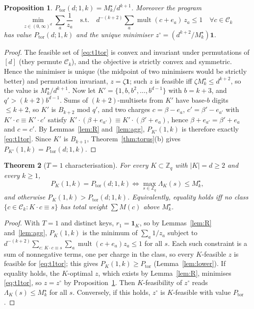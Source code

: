 \documentclass[11pt]{article}
\newcommand{\Z}{\mathbb{Z}}
\newcommand{\mult}{\operatorname{mult}}
\newcommand{\Ptor}{P_{\mathrm{tor}}}
\newtheorem{theorem}{Theorem}
\newtheorem{proposition}[theorem]{Proposition}
\theoremstyle{definition}
\theoremstyle{remark}
\begin{document}
\begin{proposition}\label{prop:t1tor}
$\Ptor(d;1,k)=M^\star_k/d^{k+1}$. Moreover the program
\begin{equation}\label{eq:t1tor}
\min_{z\in(0,\infty)^d}\sum_a\frac1{z_a}\quad\text{s.t.}\quad d^{-(k+2)}\sum_a\mult(c+e_a)\,z_a\le1\quad\forall c\in\mathcal C_k
\end{equation}
has value $\Ptor(d;1,k)$ and the unique minimiser $z^\circ=(d^{k+2}/M^\star_k)\mathbf 1$.
\end{proposition}
\begin{proof}
The feasible set of \eqref{eq:t1tor} is convex and invariant under permutations of $[d]$ (they permute $\mathcal C_k$), and the objective
is strictly convex and symmetric. Hence the minimiser is unique (the midpoint of two minimisers would be strictly better) and
permutation invariant, $z=\zeta\mathbf 1$; such $z$ is feasible iff $\zeta M^\star_k\le d^{k+2}$, so the value is $M^\star_k/d^{k+1}$.
Now let $K'=\{1,b,b^2,\dots,b^{d-1}\}$ with $b=k+3$, and $q'>(k+2)b^{d-1}$. Sums of $(k+2)$-multisets from $K'$ have base-$b$ digits $\le k+2$,
so $K'$ is $B_{k+2}$ mod $q'$, and two charges $c=\beta-e_a$, $c'=\beta'-e_{a'}$ with $K'\cdot c\equiv K'\cdot c'$ satisfy
$K'\cdot(\beta+e_{a'})\equiv K'\cdot(\beta'+e_a)$, hence $\beta+e_{a'}=\beta'+e_a$ and $c=c'$. By Lemmas~\ref{lem:R} and~\ref{lem:agg}, $P_{K'}(1,k)$
is therefore exactly \eqref{eq:t1tor}. Since $K'$ is $B_{k+1}$, Theorem~\ref{thm:torus}(b) gives $P_{K'}(1,k)=\Ptor(d;1,k)$.
\end{proof}

\begin{theorem}[$T=1$ characterisation]\label{thm:t1iff}
For every $K\subset\Z_q$ with $|K|=d\ge2$ and every $k\ge1$,
\[
P_K(1,k)=\Ptor(d;1,k)\iff\max_{s\in\Z_q}\Lambda_K(s)\le M^\star_k ,
\]
and otherwise $P_K(1,k)>\Ptor(d;1,k)$. Equivalently, equality holds iff no class $\{c\in\mathcal C_k:K\cdot c\equiv s\}$ has total
weight $\sum M(c)$ above $M^\star_k$.
\end{theorem}
\begin{proof}
With $T=1$ and distinct keys, $r_1=\mathbf 1_K$, so by Lemmas~\ref{lem:R} and~\ref{lem:agg}, $P_K(1,k)$ is the minimum of $\sum_a1/z_a$ subject
to $d^{-(k+2)}\sum_{c:\,K\cdot c\equiv s}\sum_a\mult(c+e_a)z_a\le1$ for all $s$. Each such constraint is a sum of nonnegative terms, one per
charge in the class, so every $K$-feasible $z$ is feasible for \eqref{eq:t1tor}; this gives $P_K(1,k)\ge\Ptor$ (Lemma~\ref{lem:lower}). If
equality holds, the $K$-optimal $z$, which exists by Lemma~\ref{lem:R}, minimises \eqref{eq:t1tor}, so $z=z^\circ$ by
Proposition~\ref{prop:t1tor}. Then $K$-feasibility of $z^\circ$ reads $\Lambda_K(s)\le M^\star_k$ for all $s$. Conversely, if this holds,
$z^\circ$ is $K$-feasible with value $\Ptor$.
\end{proof}
\end{document}
